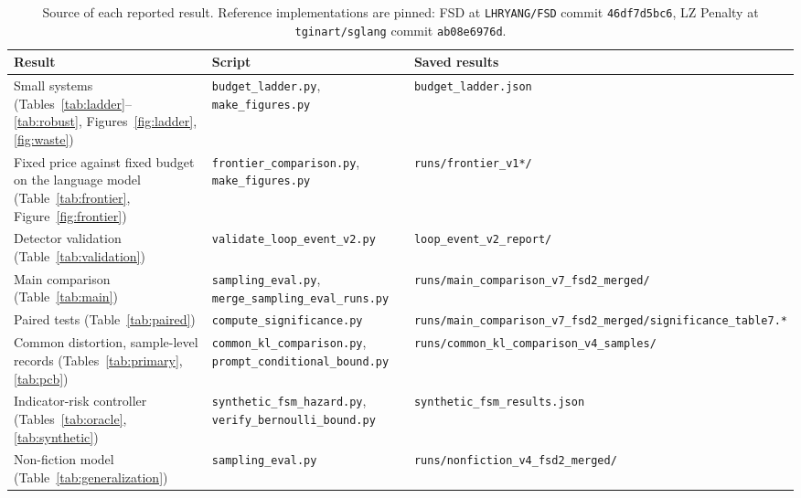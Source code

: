 \documentclass[make,article,submit,pdftex]{Definitions/mdpi}
\begin{document}
\begin{table}[H]
\centering
\caption{Source of each reported result. Reference implementations are pinned: FSD at \texttt{LHRYANG/FSD} commit \texttt{46df7d5bc6}, LZ Penalty at \texttt{tginart/sglang} commit \texttt{ab08e6976d}.}
\label{tab:manifest}
\footnotesize
\begin{tabular}{@{}p{}p{}p{}@{}}
\toprule
Result & Script & Saved results \\
\midrule
Small systems (Tables~\ref{tab:ladder}--\ref{tab:robust}, Figures~\ref{fig:ladder}, \ref{fig:waste}) & \texttt{budget\_\allowbreak{}ladder.py}, \texttt{make\_\allowbreak{}figures.py} & \texttt{budget\_\allowbreak{}ladder.json} \\
Fixed price against fixed budget on the language model (Table~\ref{tab:frontier}, Figure~\ref{fig:frontier}) & \texttt{frontier\_\allowbreak{}comparison.py}, \texttt{make\_\allowbreak{}figures.py} & \texttt{runs/frontier\_\allowbreak{}v1*/} \\
Detector validation (Table~\ref{tab:validation}) & \texttt{validate\_\allowbreak{}loop\_\allowbreak{}event\_\allowbreak{}v2.py} & \texttt{loop\_\allowbreak{}event\_\allowbreak{}v2\_\allowbreak{}report/} \\
Main comparison (Table~\ref{tab:main}) & \texttt{sampling\_\allowbreak{}eval.py}, \texttt{merge\_\allowbreak{}sampling\_\allowbreak{}eval\_\allowbreak{}runs.py} & \texttt{runs/main\_\allowbreak{}comparison\_\allowbreak{}v7\_\allowbreak{}fsd2\_\allowbreak{}merged/} \\
Paired tests (Table~\ref{tab:paired}) & \texttt{compute\_\allowbreak{}significance.py} & \texttt{runs/main\_\allowbreak{}comparison\_\allowbreak{}v7\_\allowbreak{}fsd2\_\allowbreak{}merged/significance\_\allowbreak{}table7.*} \\
Common distortion, sample-level records (Tables~\ref{tab:primary}, \ref{tab:pcb}) & \texttt{common\_\allowbreak{}kl\_\allowbreak{}comparison.py}, \texttt{prompt\_\allowbreak{}conditional\_\allowbreak{}bound.py} & \texttt{runs/common\_\allowbreak{}kl\_\allowbreak{}comparison\_\allowbreak{}v4\_\allowbreak{}samples/} \\
Indicator-risk controller (Tables~\ref{tab:oracle}, \ref{tab:synthetic}) & \texttt{synthetic\_\allowbreak{}fsm\_\allowbreak{}hazard.py}, \texttt{verify\_\allowbreak{}bernoulli\_\allowbreak{}bound.py} & \texttt{synthetic\_\allowbreak{}fsm\_\allowbreak{}results.json} \\
Non-fiction model (Table~\ref{tab:generalization}) & \texttt{sampling\_\allowbreak{}eval.py} & \texttt{runs/nonfiction\_\allowbreak{}v4\_\allowbreak{}fsd2\_\allowbreak{}merged/} \\

\end{tabular}
\end{table}
\end{document}
